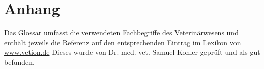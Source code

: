 

\chapter{Anhang}


	
		
\label{Glossar}

Das Glossar umfasst die verwendeten Fachbegriffe des Veterinärwesens und enthält jeweils die Referenz auf den entsprechenden Eintrag im Lexikon von \newline \url{www.vetion.de} \citep{GmbH2009} Dieses wurde von Dr. med. vet. Samuel Kohler geprüft und als gut befunden. 
\glsaddall
\printglossary

	

